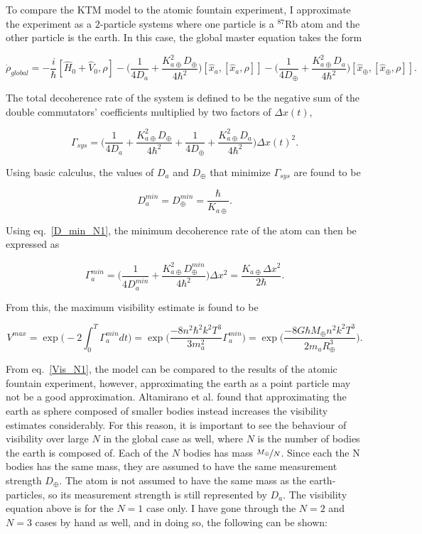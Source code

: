 \documentclass[aps, prd, superscriptaddress,twocolumn,amsmath,amssymb,nofootinbib]{revtex4-1}
\newcommand{\beq}{\begin{equation}}
\newcommand{\eeq}{\end{equation}}
\newcommand{\h}[1]{\hat#1{}}
\begin{document}
To compare the KTM model to the atomic fountain experiment, I approximate the experiment as a $2$-particle systems where one particle is a $^{87}$Rb atom and the other particle is the earth. In this case, the global master equation takes the form

\beq
 \dot\rho_{global} = -\frac{i}{\hbar}[\h H_0+\h V_0, \rho] 
 -\bigg(\frac{1}{4D_a}+\frac{K_{a\oplus}^2D_\oplus}{4\hbar^2}\bigg)[\h x_a, [\h x_a,\rho]]
  -\bigg(\frac{1}{4D_\oplus}+\frac{K_{a\oplus}^2D_a}{4\hbar^2}\bigg)[\h x_\oplus, [\h x_\oplus,\rho]].
  \label{ME_global_N1}
 \eeq
 
 The total decoherence rate of the system is defined to be the negative sum of the double commutators' coefficients multiplied by two factors of $\Delta x(t)$,
 
 \beq
\Gamma_{sys}=\bigg(\frac{1}{4D_a}+\frac{K_{a\oplus}^2D_\oplus}{4\hbar^2} + \frac{1}{4D_\oplus}+\frac{K_{a\oplus}^2D_a}{4\hbar^2}\bigg)\Delta x(t)^2.
\eeq

Using basic calculus, the values of $D_a$ and $D_\oplus$ that minimize $\Gamma_{sys}$ are found to be

\beq
D_a^{min} = D_\oplus^{min} = \frac{\hbar}{K_{a\oplus}}.
\label{D_min_N1}
 \eeq

Using eq.~\eqref{D_min_N1}, the minimum decoherence rate of the atom can then be expressed as

 \beq
\Gamma_a^{min}=\bigg(\frac{1}{4D_a^{min}}+\frac{K_{a\oplus}^2D_\oplus^{min}}{4\hbar^2}\bigg)\Delta x^2=\frac{K_{a\oplus} \Delta x^2}{2\hbar}.
\eeq
 
 From this, the maximum visibility estimate is found to be
 
\beq
V^{max}=\exp{\bigg(-2\int_0^T \Gamma_a^{min} dt\bigg)}=\exp{\bigg(\frac{-8n^2\hbar^2k^2T^3}{3m_a^2}\Gamma_a^{min}\bigg)} = \exp{\bigg(\frac{-8G\hbar M_\oplus n^2 k^2 T^3}{2 m_a R_\oplus^3}\bigg)}.
\label{Vis_N1}
\eeq

From eq.~\eqref{Vis_N1}, the model can be compared to the results of the atomic fountain experiment, however, approximating the earth as a point particle may not be a good approximation. Altamirano et al. found that approximating the earth as sphere composed of smaller bodies instead increases the visibility estimates considerably. For this reason, it is important to see the behaviour of visibility over large $N$ in the global case as well, where $N$ is the number of bodies the earth is composed of. Each of the $N$ bodies has mass $\nicefrac{M_\oplus}{N}$. Since each the N bodies has the same mass, they are assumed to have the same measurement strength $D_\oplus$. The atom is not assumed to have the same mass as  the earth-particles, so its measurement strength is still represented by $D_a$. The visibility equation above is for the $N=1$ case only. I have gone through the $N=2$ and $N=3$ cases by hand as well, and in doing so, the following can be shown:
\end{document}
